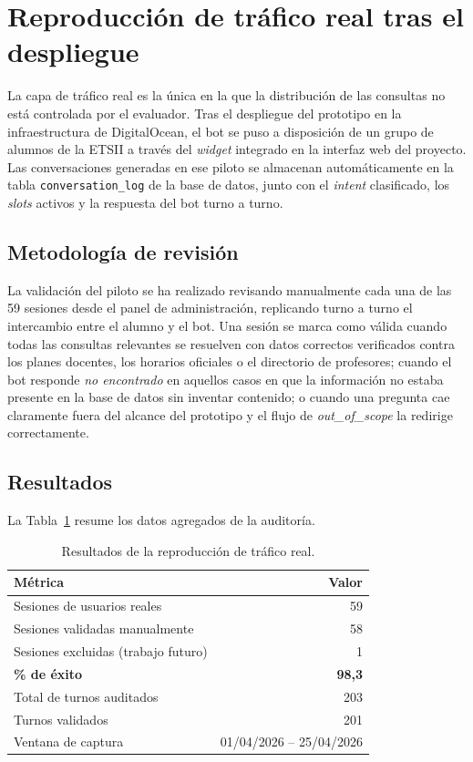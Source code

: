 \section{Reproducción de tráfico real tras el despliegue}\label{sec:pruebas-trafico}

La capa de tráfico real es la única en la que la distribución de las consultas no está controlada por el evaluador. Tras el despliegue del prototipo en la infraestructura de DigitalOcean, el bot se puso a disposición de un grupo de alumnos de la ETSII a través del \textit{widget} integrado en la interfaz web del proyecto. Las conversaciones generadas en ese piloto se almacenan automáticamente en la tabla \texttt{conversation\_log} de la base de datos, junto con el \textit{intent} clasificado, los \textit{slots} activos y la respuesta del bot turno a turno.

\subsection{Metodología de revisión}\label{subsec:trafico-metodologia}

La validación del piloto se ha realizado revisando manualmente cada una de las 59 sesiones desde el panel de administración, replicando turno a turno el intercambio entre el alumno y el bot. Una sesión se marca como válida cuando todas las consultas relevantes se resuelven con datos correctos verificados contra los planes docentes, los horarios oficiales o el directorio de profesores; cuando el bot responde \textit{no encontrado} en aquellos casos en que la información no estaba presente en la base de datos sin inventar contenido; o cuando una pregunta cae claramente fuera del alcance del prototipo y el flujo de \textit{out\_of\_scope} la redirige correctamente.

\subsection{Resultados}\label{subsec:trafico-resultados}

La Tabla~\ref{tab:trafico-resultados} resume los datos agregados de la auditoría.

\begin{table}[hbtp]
\centering
\caption{Resultados de la reproducción de tráfico real.}\label{tab:trafico-resultados}
\begin{tabular}{lr}
\hline
\textbf{Métrica} & \textbf{Valor} \\
\hline
Sesiones de usuarios reales & 59 \\
Sesiones validadas manualmente & 58 \\
Sesiones excluidas (trabajo futuro) & 1 \\
\textbf{\% de éxito} & \textbf{98,3} \\
Total de turnos auditados & 203 \\
Turnos validados & 201 \\
Ventana de captura & 01/04/2026 -- 25/04/2026 \\
\hline
\end{tabular}
\end{table}

